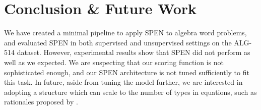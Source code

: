 \documentclass[11pt,letterpaper]{article}
\begin{document}
\section{Conclusion \& Future Work}
We have created a minimal pipeline to apply SPEN to algebra word problems, and evaluated SPEN in both supervised and unsupervised settings on the ALG-514 dataset. However, experimental results show that SPEN did not perform as well as we expected. We are suspecting that our scoring function is not sophisticated enough, and our SPEN architecture is not tuned sufficiently to fit this task. In future, aside from tuning the model further, we are interested in adopting a structure which can scale to the number of types in equations, such as rationales proposed by \cite{DBLP:journals/corr/LingYDB17}.
\nocite{*}


\end{document}

